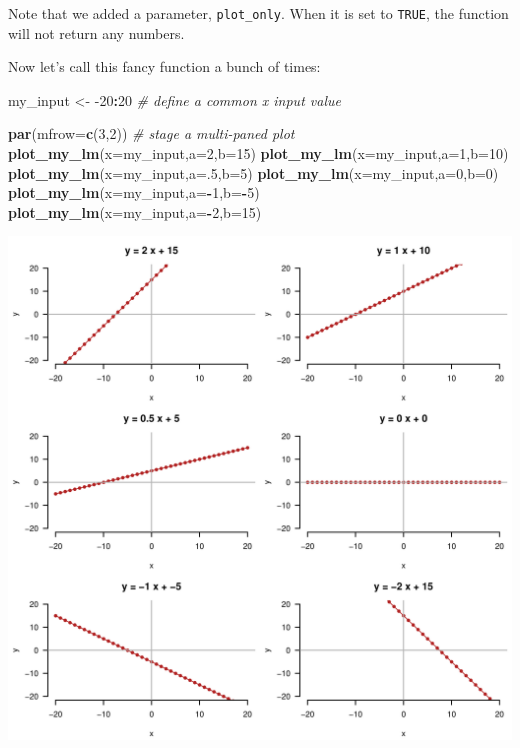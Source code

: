 \documentclass[
]{book}
\newenvironment{Shaded}{\begin{snugshade}}{\end{snugshade}}
\newcommand{\CommentTok}[1]{\textcolor[rgb]{0.56,0.35,0.01}{\textit{#1}}}
\newcommand{\DataTypeTok}[1]{\textcolor[rgb]{0.13,0.29,0.53}{#1}}
\newcommand{\DecValTok}[1]{\textcolor[rgb]{0.00,0.00,0.81}{#1}}
\newcommand{\KeywordTok}[1]{\textcolor[rgb]{0.13,0.29,0.53}{\textbf{#1}}}
\newcommand{\NormalTok}[1]{#1}
\newcommand{\OperatorTok}[1]{\textcolor[rgb]{0.81,0.36,0.00}{\textbf{#1}}}
\newcommand{\StringTok}[1]{\textcolor[rgb]{0.31,0.60,0.02}{#1}}
\begin{document}
Note that we added a parameter, \texttt{plot\_only}. When it is set to \texttt{TRUE}, the function will not return any numbers.

Now let's call this fancy function a bunch of times:

\begin{Shaded}
\begin{Highlighting}[]
\NormalTok{my_input <-}\StringTok{ }\DecValTok{-20}\OperatorTok{:}\DecValTok{20} \CommentTok{# define a common x input value}

\KeywordTok{par}\NormalTok{(}\DataTypeTok{mfrow=}\KeywordTok{c}\NormalTok{(}\DecValTok{3}\NormalTok{,}\DecValTok{2}\NormalTok{)) }\CommentTok{# stage a multi-paned plot}
\KeywordTok{plot_my_lm}\NormalTok{(}\DataTypeTok{x=}\NormalTok{my_input,}\DataTypeTok{a=}\DecValTok{2}\NormalTok{,}\DataTypeTok{b=}\DecValTok{15}\NormalTok{)}
\KeywordTok{plot_my_lm}\NormalTok{(}\DataTypeTok{x=}\NormalTok{my_input,}\DataTypeTok{a=}\DecValTok{1}\NormalTok{,}\DataTypeTok{b=}\DecValTok{10}\NormalTok{)}
\KeywordTok{plot_my_lm}\NormalTok{(}\DataTypeTok{x=}\NormalTok{my_input,}\DataTypeTok{a=}\NormalTok{.}\DecValTok{5}\NormalTok{,}\DataTypeTok{b=}\DecValTok{5}\NormalTok{)}
\KeywordTok{plot_my_lm}\NormalTok{(}\DataTypeTok{x=}\NormalTok{my_input,}\DataTypeTok{a=}\DecValTok{0}\NormalTok{,}\DataTypeTok{b=}\DecValTok{0}\NormalTok{)}
\KeywordTok{plot_my_lm}\NormalTok{(}\DataTypeTok{x=}\NormalTok{my_input,}\DataTypeTok{a=}\OperatorTok{-}\DecValTok{1}\NormalTok{,}\DataTypeTok{b=}\OperatorTok{-}\DecValTok{5}\NormalTok{)}
\KeywordTok{plot_my_lm}\NormalTok{(}\DataTypeTok{x=}\NormalTok{my_input,}\DataTypeTok{a=}\OperatorTok{-}\DecValTok{2}\NormalTok{,}\DataTypeTok{b=}\DecValTok{15}\NormalTok{)}
\end{Highlighting}
\end{Shaded}

\includegraphics{figures/unnamed-chunk-240-1.pdf}
\end{document}
